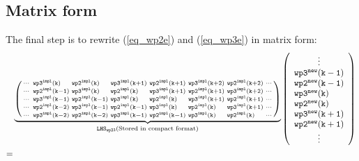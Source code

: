 \documentclass[11pt,fleqn]{article}
\begin{document}
\subsection{Matrix form}

The final step is to rewrite (\ref{eq_wp2e}) and (\ref{eq_wp3e}) in matrix
form:
%
\begin{equation}
\begin{split}
&
\underbrace{
\left( \begin{smallmatrix}
  \cdots  %
  & \mathtt{wp3^{impl}(k)\phantom{+0} }
  & \mathtt{wp2^{impl}(k)\phantom{+0} }
  & \mathtt{wp3^{impl}(k+1) }
  & \mathtt{wp2^{impl}(k+1) }
  & \mathtt{wp3^{impl}(k+2) }
  & \mathtt{wp2^{impl}(k+2) }
  & \cdots \\
  \cdots  %
  & \mathtt{wp2^{impl}(k-1) }
  & \mathtt{wp3^{impl}(k)\phantom{+0} }
  & \mathtt{wp2^{impl}(k)\phantom{+0} }
  & \mathtt{wp3^{impl}(k+1) }
  & \mathtt{wp2^{impl}(k+1) }
  & \mathtt{wp3^{impl}(k+2) }
  & \cdots \\
  \cdots %
  & \mathtt{wp3^{impl}(k-1) }
  & \mathtt{wp2^{impl}(k-1) }
  & \mathtt{wp3^{impl}(k)\phantom{+0} }
  & \mathtt{wp2^{impl}(k)\phantom{+0} }
  & \mathtt{wp3^{impl}(k+1) }
  & \mathtt{wp2^{impl}(k+1) }
  & \cdots \\
  \cdots %
  & \mathtt{wp2^{impl}(k-2) }
  & \mathtt{wp3^{impl}(k-1) }
  & \mathtt{wp2^{impl}(k-1) }
  & \mathtt{wp3^{impl}(k)\phantom{+0} }
  & \mathtt{wp2^{impl}(k)\phantom{+0} }
  & \mathtt{wp3^{impl}(k+1) }
  & \cdots \\
  \cdots %
  & \mathtt{wp3^{impl}(k-2) }
  & \mathtt{wp2^{impl}(k-2) }
  & \mathtt{wp3^{impl}(k-1) }
  & \mathtt{wp2^{impl}(k-1) }
  & \mathtt{wp3^{impl}(k)\phantom{+0} }
  & \mathtt{wp2^{impl}(k)\phantom{+0} }
  & \cdots
\end{smallmatrix} \right) }_{\mathtt{LHS_{wp23}}\textrm{(Stored in compact format)}}
\left( \begin{array}{l}
  \hfill \vdots \hfill \\
  \mathtt{ wp3^{new}(k-1) } \\
  \mathtt{ wp2^{new}(k-1) } \\
  \mathtt{ wp3^{new}(k)   } \\
  \mathtt{ wp2^{new}(k)   } \\
  \mathtt{ wp3^{new}(k+1) } \\
  \mathtt{ wp2^{new}(k+1) } \\
  \hfill \vdots \hfill
\end{array} \right)
\\ = &

\end{split}
\end{equation}
\end{document}

